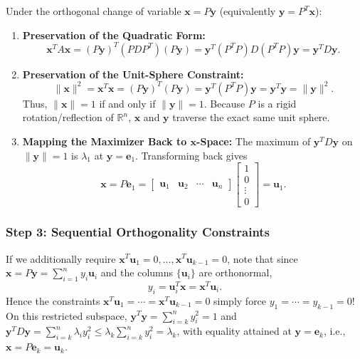 \documentclass[11pt, letterpaper]{article}
\theoremstyle{definition}
\theoremstyle{remark}
\newcommand{\R}{\mathbb{R}}
\begin{document}
Under the orthogonal change of variable $\mathbf{x} = P\mathbf{y}$ (equivalently $\mathbf{y} = P^T \mathbf{x}$):
\begin{enumerate}[label=(\arabic*)]
    \item \textbf{Preservation of the Quadratic Form:}
    \[
    \mathbf{x}^T A \mathbf{x} = (P\mathbf{y})^T (P D P^T)(P\mathbf{y}) = \mathbf{y}^T (P^T P) D (P^T P) \mathbf{y} = \mathbf{y}^T D \mathbf{y}.
    \]
    \item \textbf{Preservation of the Unit-Sphere Constraint:}
    \[
    \|\mathbf{x}\|^2 = \mathbf{x}^T \mathbf{x} = (P\mathbf{y})^T (P\mathbf{y}) = \mathbf{y}^T (P^T P)\mathbf{y} = \mathbf{y}^T \mathbf{y} = \|\mathbf{y}\|^2.
    \]
    Thus, $\|\mathbf{x}\| = 1$ if and only if $\|\mathbf{y}\| = 1$. Because $P$ is a rigid rotation/reflection of $\R^n$, $\mathbf{x}$ and $\mathbf{y}$ traverse the exact same unit sphere.
    \item \textbf{Mapping the Maximizer Back to $\mathbf{x}$-Space:}
    The maximum of $\mathbf{y}^T D \mathbf{y}$ on $\|\mathbf{y}\|=1$ is $\lambda_1$ at $\mathbf{y} = \mathbf{e}_1$. Transforming back gives
    \[
    \mathbf{x} = P\mathbf{e}_1 = \begin{bmatrix} \mathbf{u}_1 & \mathbf{u}_2 & \cdots & \mathbf{u}_n \end{bmatrix} \begin{bmatrix} 1 \\ 0 \\ \vdots \\ 0 \end{bmatrix} = \mathbf{u}_1.
    \]
\end{enumerate}

\subsubsection*{Step 3: Sequential Orthogonality Constraints}
If we additionally require $\mathbf{x}^T \mathbf{u}_1 = 0, \dots, \mathbf{x}^T \mathbf{u}_{k-1} = 0$, note that since $\mathbf{x} = P\mathbf{y} = \sum_{i=1}^n y_i \mathbf{u}_i$ and the columns $\{\mathbf{u}_i\}$ are orthonormal,
\[
y_i = \mathbf{u}_i^T \mathbf{x} = \mathbf{x}^T \mathbf{u}_i.
\]
Hence the constraints $\mathbf{x}^T \mathbf{u}_1 = \cdots = \mathbf{x}^T \mathbf{u}_{k-1} = 0$ simply force $y_1 = \cdots = y_{k-1} = 0$! On this restricted subspace, $\mathbf{y}^T \mathbf{y} = \sum_{i=k}^n y_i^2 = 1$ and $\mathbf{y}^T D \mathbf{y} = \sum_{i=k}^n \lambda_i y_i^2 \le \lambda_k \sum_{i=k}^n y_i^2 = \lambda_k$, with equality attained at $\mathbf{y} = \mathbf{e}_k$, i.e., $\mathbf{x} = P\mathbf{e}_k = \mathbf{u}_k$.
\end{document}
